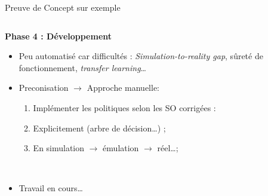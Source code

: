     \begin{frame}[fragile]{Preuve de Concept sur exemple}
    
    \begin{columns}
    
        \begin{column}{0.6\textwidth}
    
            \textbf{Phase 4 : Développement}

            \begin{itemize}
                \item Peu automatisé car difficultés : \textit{Simulation-to-reality gap}, sûreté de fonctionnement, \textit{transfer learning}\dots

                \item Preconisation $\rightarrow$ Approche manuelle:
                \begin{enumerate}
                    \item Implémenter les politiques selon les SO corrigées :
                    \item Explicitement (arbre de décision\dots) ;
                    \item En simulation $\rightarrow$ émulation $\rightarrow$ réel\dots ;
                \end{enumerate}
            \end{itemize}

            \

            \begin{itemize}
                \item Travail en cours\dots
            \end{itemize}

        \end{column}
    

\end{columns}
\end{frame}
